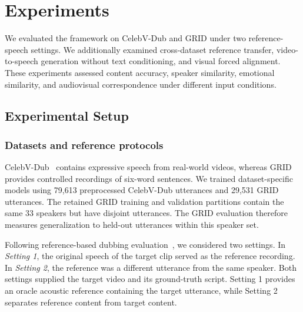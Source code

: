 \section{Experiments}
\label{sec:experiments}

We evaluated the framework on CelebV-Dub and GRID under two reference-speech settings. We additionally examined cross-dataset reference transfer, video-to-speech generation without text conditioning, and visual forced alignment. These experiments assessed content accuracy, speaker similarity, emotional similarity, and audiovisual correspondence under different input conditions.

\subsection{Experimental Setup}
\label{sec:experimental_setup}

\subsubsection{Datasets and reference protocols}

CelebV-Dub~\cite{sungbin2025voicecraftdub} contains expressive speech from real-world videos, whereas GRID~\cite{cooke2006grid} provides controlled recordings of six-word sentences. We trained dataset-specific models using 79,613 preprocessed CelebV-Dub utterances and 29,531 GRID utterances. The retained GRID training and validation partitions contain the same 33 speakers but have disjoint utterances. The GRID evaluation therefore measures generalization to held-out utterances within this speaker set.

Following reference-based dubbing evaluation~\cite{cong2024styledubber,zhang2024speaker2dubber}, we considered two settings. In \emph{Setting 1}, the original speech of the target clip served as the reference recording. In \emph{Setting 2}, the reference was a different utterance from the same speaker. Both settings supplied the target video and its ground-truth script. Setting 1 provides an oracle acoustic reference containing the target utterance, while Setting 2 separates reference content from target content.

